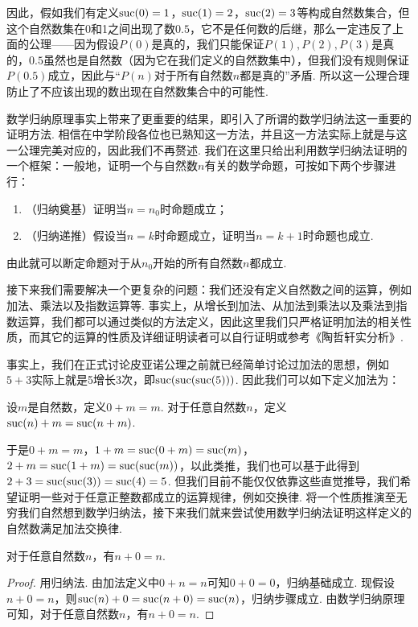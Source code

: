 因此，假如我们有定义$\operatorname{suc}(0)=1$，$\operatorname{suc}(1)=2$，$\operatorname{suc}(2)=3$等构成自然数集合，但这个自然数集在0和1之间出现了数$0.5$，它不是任何数的后继，那么一定违反了上面的公理——因为假设$P(0)$是真的，我们只能保证$P(1),P(2),P(3)$是真的，$0.5$虽然也是自然数（因为它在我们定义的自然数集中），但我们没有规则保证$P(0.5)$成立，因此与``$P(n)$对于所有自然数$n$都是真的''矛盾. 所以这一公理合理防止了不应该出现的数出现在自然数集合中的可能性.

数学归纳原理事实上带来了更重要的结果，即引入了所谓的数学归纳法这一重要的证明方法. 相信在中学阶段各位也已熟知这一方法，并且这一方法实际上就是与这一公理完美对应的，因此我们不再赘述. 我们在这里只给出利用数学归纳法证明的一个框架：一般地，证明一个与自然数$n$有关的数学命题，可按如下两个步骤进行：
\begin{enumerate}
    \item（归纳奠基）证明当$n=n_0$时命题成立；

    \item（归纳递推）假设当$n=k$时命题成立，证明当$n=k+1$时命题也成立.
\end{enumerate}
由此就可以断定命题对于从$n_0$开始的所有自然数$n$都成立.

接下来我们需要解决一个更复杂的问题：我们还没有定义自然数之间的运算，例如加法、乘法以及指数运算等. 事实上，从增长到加法、从加法到乘法以及乘法到指数运算，我们都可以通过类似的方法定义，因此这里我们只严格证明加法的相关性质，而其它的运算的性质及详细证明读者可以自行证明或参考《陶哲轩实分析》.

事实上，我们在正式讨论皮亚诺公理之前就已经简单讨论过加法的思想，例如$5+3$实际上就是5增长3次，即$\operatorname{suc}(\operatorname{suc}(\operatorname{suc}(5)))$. 因此我们可以如下定义加法为：

\begin{definition}
    设$m$是自然数，定义$0+m=m$. 对于任意自然数$n$，定义$\operatorname{suc}(n)+m=\operatorname{suc}(n+m)$.
\end{definition}

于是$0+m=m$，$1+m=\operatorname{suc}(0+m)=\operatorname{suc}(m)$，$2+m=\operatorname{suc}(1+m)=\operatorname{suc}(\operatorname{suc}(m))$，以此类推，我们也可以基于此得到$2+3=\operatorname{suc}(\operatorname{suc}(3))=\operatorname{suc}(4)=5$. 但我们目前不能仅仅依靠这些直觉推导，我们希望证明一些对于任意正整数都成立的运算规律，例如交换律. 将一个性质推演至无穷我们自然想到数学归纳法，接下来我们就来尝试使用数学归纳法证明这样定义的自然数满足加法交换律.

\begin{lemma}
    对于任意自然数$n$，有$n+0=n$.
\end{lemma}
\begin{proof}
    用归纳法. 由加法定义中$0+n=n$可知$0+0=0$，归纳基础成立. 现假设$n+0=n$，则$\operatorname{suc}(n)+0=\operatorname{suc}(n+0)=\operatorname{suc}(n)$，归纳步骤成立. 由数学归纳原理可知，对于任意自然数$n$，有$n+0=n$.
\end{proof}


